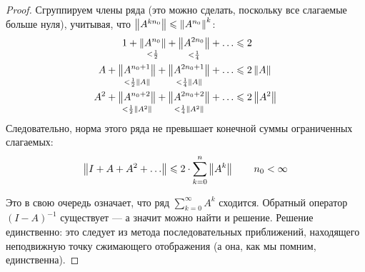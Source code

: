 \documentclass[12pt]{article}
\begin{document}
\begin{proof}
			Сгруппируем члены ряда (это можно сделать, поскольку все слагаемые больше нуля), учитывая, что $\left\| A^{k n_0} \right\| \leqslant \left\| A^{n_0} \right\|^{k}$:
			\begin{align*}
				1 + \underset{< \frac{1}{2}}{\left\| A^{n_0} \right\|} + \underset{< \frac{1}{4}}{\left\| A^{2n_0} \right\|} + \ldots &\leqslant 2 \\
				A + \underset{< \frac{1}{2}\left\| A \right\|}{\left\| A^{n_0+1} \right\|} 
				+ \underset{< \frac{1}{4}\left\| A \right\|}{\left\| A^{2n_0+1} \right\|} + \ldots &\leqslant 2 \left\| A \right\| \\
				A^2 + \underset{< \frac{1}{2}\left\| A^2 \right\|}{\left\| A^{n_0+2} \right\|} 
				+ \underset{< \frac{1}{4}\left\| A^2 \right\|}{\left\| A^{2n_0+2} \right\|} + \ldots &\leqslant 2 \left\| A^2 \right\| \\
			\end{align*}
			Следовательно, норма этого ряда не превышает конечной суммы ограниченных слагаемых:
			$$\left\| I + A + A^2 + \ldots \right\| \leqslant 2\cdot\sum_{k=0}^n\left\| A^k \right\| \qquad n_0 < \infty$$
			
			Это в свою очередь означает, что ряд $\sum_{k=0}^\infty A^k$ сходится. Обратный оператор
			$(I-A)^{-1}$ существует --- а значит можно найти и решение. Решение единственно: это следует из
			метода последовательных приближений, находящего неподвижную точку сжимающего отображения (а она,
			как мы помним, единственна).
		\end{proof}
\end{document}
